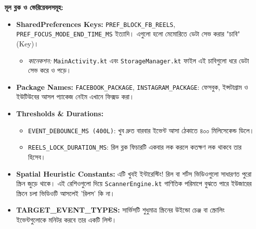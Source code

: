 \documentclass[12pt, a4paper]{article}
\begin{document}
\begin{tcolorbox}[colback=blue!5!white,colframe=blue!75!black,title={১. Constants.kt}]
\textbf{মূল ব্লক ও ভেরিয়েবলসমূহ:}
\begin{itemize}[label=$\circ$]
    \item \textbf{SharedPreferences Keys:} \texttt{PREF\_BLOCK\_FB\_REELS}, \texttt{PREF\_FOCUS\_MODE\_END\_TIME\_MS} ইত্যাদি। এগুলো হলো মেমোরিতে ডেটা সেভ করার "চাবি" (Key)। 
    \begin{itemize}[label=--]
        \item \textit{কানেকশন:} \texttt{MainActivity.kt} এবং \texttt{StorageManager.kt} ফাইল এই চাবিগুলো ধরে ডেটা সেভ করে ও পড়ে।
    \end{itemize}
    \item \textbf{Package Names:} \texttt{FACEBOOK\_PACKAGE}, \texttt{INSTAGRAM\_PACKAGE}: ফেসবুক, ইন্সটাগ্রাম ও ইউটিউবের আসল প্যাকেজ নেইম এখানে ফিক্সড করা।
    \item \textbf{Thresholds \& Durations:} 
    \begin{itemize}[label=--]
        \item \texttt{EVENT\_DEBOUNCE\_MS (400L)}: খুব দ্রুত বারবার ইভেন্ট আসা ঠেকাতে ৪০০ মিলিসেকেন্ড ডিলে।
        \item \texttt{REELS\_LOCK\_DURATION\_MS}: রিল ব্লক ফিচারটি একবার লক করলে কতক্ষণ লক থাকবে তার হিসেব।
    \end{itemize}
    \item \textbf{Spatial Heuristic Constants:} এটি খুবই ইন্টারেস্টিং! রিল বা শর্টস ভিডিওগুলো সাধারণত পুরো স্ক্রিন জুড়ে থাকে। এই রেশিওগুলো দিয়ে \texttt{ScannerEngine.kt} গাণিতিক পরিমাপে বুঝতে পারে ইউজারের স্ক্রিনে চলা ভিডিওটি আসলেই 'রিলস' কি না। 
    \item \textbf{TARGET\_EVENT\_TYPES:} সার্ভিসটি শুধুমাত্র স্ক্রিনের উইন্ডো চেঞ্জ বা স্ক্রোলিং ইভেন্টগুলোকে মনিটর করবে তার একটি লিস্ট।
\end{itemize}
\end{tcolorbox}
\end{document}
